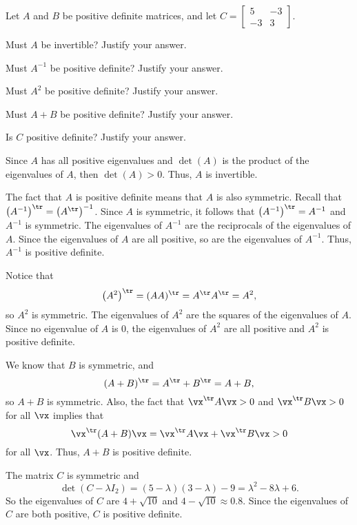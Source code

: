 \begin{example} Let $A$ and $B$ be positive definite matrices, and let $C = \left[ \begin{array}{rr}5&-3\\-3&3 \end{array} \right]$. 
\ba
\item Must $A$ be invertible? Justify your answer. 

\item Must $A^{-1}$ be positive definite? Justify your answer. 

\item Must $A^{2}$ be positive definite? Justify your answer. 

\item Must $A+B$ be positive definite? Justify your answer. 

\item Is $C$ positive definite? Justify your answer. 

\ea

\ExampleSolution

\ba
\item Since $A$ has all positive eigenvalues and $\det(A)$ is the product of the eigenvalues of $A$, then $\det(A) > 0$. Thus, $A$ is invertible.

\item The fact that $A$ is positive definite means that $A$ is also symmetric. Recall that $\left(A^{-1}\right)^{\tr} = \left(A^{\tr}\right)^{-1}$. Since $A$ is symmetric, it follows that $\left(A^{-1}\right)^{\tr} = A^{-1}$ and $A^{-1}$ is symmetric. The eigenvalues of $A^{-1}$ are the reciprocals of the eigenvalues of $A$. Since the eigenvalues of $A$ are all positive, so are the eigenvalues of $A^{-1}$. Thus, $A^{-1}$ is positive definite.

\item Notice that 
\[\left(A^2\right)^{\tr} = (AA)^{\tr} = A^{\tr}A^{\tr} = A^2,\]
so $A^2$ is symmetric. The eigenvalues of $A^2$ are the squares of the eigenvalues of $A$. Since no eigenvalue of $A$ is $0$, the eigenvalues of $A^2$ are all positive and $A^2$ is positive definite. 

\item We know that $B$ is symmetric, and 
\[(A+B)^{\tr} = A^{\tr} + B^{\tr} = A+B,\]
so $A+B$ is symmetric. Also, the fact that $\vx^{\tr}A\vx > 0$ and $\vx^{\tr}B\vx > 0$ for all $\vx$ implies that 
\[\vx^{\tr}(A+B)\vx = \vx^{\tr}A\vx + \vx^{\tr}B\vx > 0\]
for all $\vx$. Thus, $A+B$ is positive definite. 

\item The matrix $C$ is symmetric and 
\[\det(C - \lambda I_2) = (5-\lambda)(3-\lambda) - 9 = \lambda^2-8\lambda+6.\]
So the eigenvalues of $C$ are $4 + \sqrt{10}$ and $4 - \sqrt{10} \approx 0.8$. Since the eigenvalues of $C$ are both positive, $C$ is positive definite. 

\ea
\end{example}

